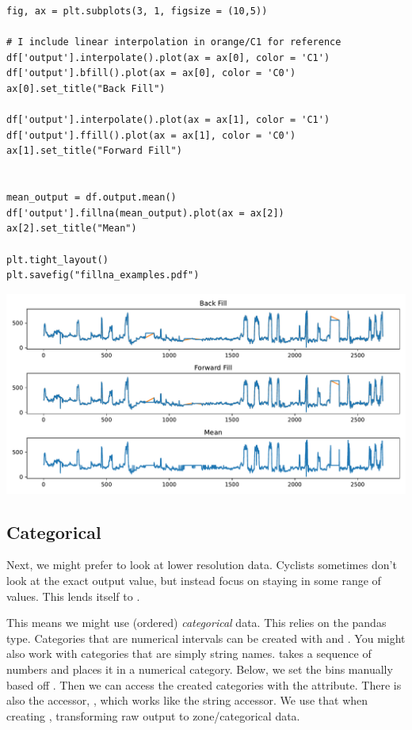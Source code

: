 \begin{lstlisting}
fig, ax = plt.subplots(3, 1, figsize = (10,5))

# I include linear interpolation in orange/C1 for reference
df['output'].interpolate().plot(ax = ax[0], color = 'C1')
df['output'].bfill().plot(ax = ax[0], color = 'C0')
ax[0].set_title("Back Fill")

df['output'].interpolate().plot(ax = ax[1], color = 'C1')
df['output'].ffill().plot(ax = ax[1], color = 'C0')
ax[1].set_title("Forward Fill")


mean_output = df.output.mean()
df['output'].fillna(mean_output).plot(ax = ax[2])
ax[2].set_title("Mean")

plt.tight_layout()
plt.savefig("fillna_examples.pdf")
\end{lstlisting}

\begin{center}
    \includegraphics[width = .9\textwidth]{images/fillna_examples.pdf}
\end{center}

\subsection{Categorical}

Next, we might prefer to look at lower resolution data. Cyclists sometimes don't look at the exact output value, but instead focus on staying in some range of values. This lends itself to . 

This means we might use (ordered) \emph{categorical} data. This relies on the pandas  type. Categories that are numerical intervals can be created with  and . You might also work with categories that are simply string names.  takes a sequence of numbers and places it in a numerical category. Below, we set the bins manually based off . Then we can access the created categories with the  attribute. There is also the accessor, , which works like the  string accessor. We use that when creating , transforming raw output to zone/categorical data. 

